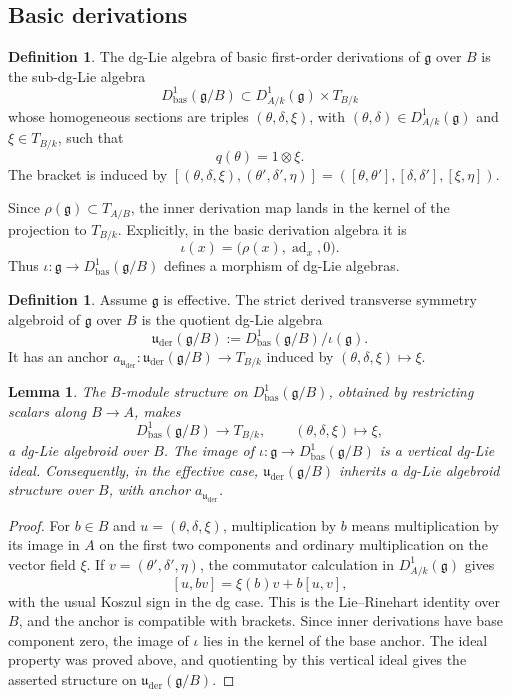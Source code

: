 \documentclass[11pt,reqno,a4paper,dvipsnames,x11names]{amsart}
\numberwithin{equation}{section}
\theoremstyle{plain}
\newtheorem{lemma}[theorem]{Lemma}
\theoremstyle{definition}
\newtheorem{definition}[theorem]{Definition}
\theoremstyle{remark}
\newcommand{\kk}{k}
\newcommand{\g}{\mathfrak g}
\newcommand{\uuder}{\mathfrak u_{\mathrm{der}}}
\newcommand{\bas}{\mathrm{bas}}
\newcommand{\from}{\colon}
\begin{document}
\subsection{Basic derivations}

\begin{definition}
The dg-Lie algebra of basic first-order derivations of \(\g\) over \(B\) is the sub-dg-Lie algebra
\[
 D^1_{\bas}(\g/B)\subset D^1_{A/\kk}(\g)\times T_{B/\kk}
\]
whose homogeneous sections are triples \((\theta,\delta,\xi)\), with \((\theta,\delta)\in D^1_{A/\kk}(\g)\) and \(\xi\in T_{B/\kk}\), such that
\[
 q(\theta)=1\otimes\xi.
\]
The bracket is induced by
$
 [(\theta,\delta,\xi),(\theta',\delta',\eta)]
 =([\theta,\theta'],[\delta,\delta'],[\xi,\eta]).
$
\end{definition}

Since \(\rho(\g)\subset T_{A/B}\), the inner derivation map lands in the kernel of the projection to \(T_{B/\kk}\). Explicitly, in the basic derivation algebra it is
\[
 \iota(x)=\bigl(\rho(x),\operatorname{ad}_x,0\bigr).
\]
Thus
$
 \iota\from\g\longrightarrow D^1_{\bas}(\g/B)
$
defines a morphism of dg-Lie algebras.

\begin{definition}
Assume \(\g\) is effective. The strict derived transverse symmetry algebroid of \(\g\) over \(B\) is the quotient dg-Lie algebra
\[
 \uuder(\g/B):=D^1_{\bas}(\g/B)/\iota(\g).
\]
It has an anchor
$
 a_{\uuder}\from \uuder(\g/B)\longrightarrow T_{B/\kk}
$
induced by \((\theta,\delta,\xi)\mapsto\xi\).
\end{definition}

\begin{lemma}\label{lem:base-LR-controller}
The \(B\)-module structure on \(D^1_{\bas}(\g/B)\), obtained by restricting scalars along \(B\to A\), makes
\[
 D^1_{\bas}(\g/B)\longrightarrow T_{B/\kk},
 \qquad (\theta,\delta,\xi)\longmapsto \xi,
\]
a dg-Lie algebroid over \(B\). The image of
\(\iota\from\g\to D^1_{\bas}(\g/B)\) is a vertical dg-Lie ideal. Consequently, in the effective case, \(\uuder(\g/B)\) inherits a dg-Lie algebroid structure over \(B\), with anchor \(a_{\uuder}\).
\end{lemma}

\begin{proof}
For \(b\in B\) and \(u=(\theta,\delta,\xi)\), multiplication by \(b\) means multiplication by its image in \(A\) on the first two components and ordinary multiplication on the vector field \(\xi\). If \(v=(\theta',\delta',\eta)\), the commutator calculation in \(D^1_{A/\kk}(\g)\) gives
\[
 [u,bv]=\xi(b)v+b[u,v],
\]
with the usual Koszul sign in the dg case. This is the Lie--Rinehart identity over \(B\), and the anchor is compatible with brackets. Since inner derivations have base component zero, the image of \(\iota\) lies in the kernel of the base anchor. The ideal property was proved above, and quotienting by this vertical ideal gives the asserted structure on \(\uuder(\g/B)\).
\end{proof}
\end{document}
